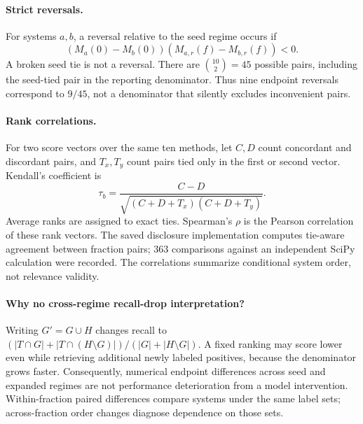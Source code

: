 \paragraph{Strict reversals.}
For systems $a,b$, a reversal relative to the seed regime occurs if
\begin{equation}
 (M_a(0)-M_b(0))(M_{a,r}(f)-M_{b,r}(f))<0.
\end{equation}
A broken seed tie is not a reversal. There are $\binom{10}{2}=45$ possible pairs, including the seed-tied pair in the reporting denominator. Thus nine endpoint reversals correspond to $9/45$, not a denominator that silently excludes inconvenient pairs.

\paragraph{Rank correlations.}
For two score vectors over the same ten methods, let $C,D$ count concordant and discordant pairs, and $T_x,T_y$ count pairs tied only in the first or second vector. Kendall's coefficient is
\begin{equation}
\tau_b=\frac{C-D}{\sqrt{(C+D+T_x)(C+D+T_y)}}.
\end{equation}
Average ranks are assigned to exact ties. Spearman's $\rho$ is the Pearson correlation of these rank vectors. The saved disclosure implementation computes tie-aware agreement between fraction pairs; 363 comparisons against an independent SciPy calculation were recorded. The correlations summarize conditional system order, not relevance validity.

\paragraph{Why no cross-regime recall-drop interpretation?}
Writing $G'=G\cup H$ changes recall to $(|T\cap G|+|T\cap(H\setminus G)|)/(|G|+|H\setminus G|)$. A fixed ranking may score lower even while retrieving additional newly labeled positives, because the denominator grows faster. Consequently, numerical endpoint differences across seed and expanded regimes are not performance deterioration from a model intervention. Within-fraction paired differences compare systems under the same label sets; across-fraction order changes diagnose dependence on those sets.

